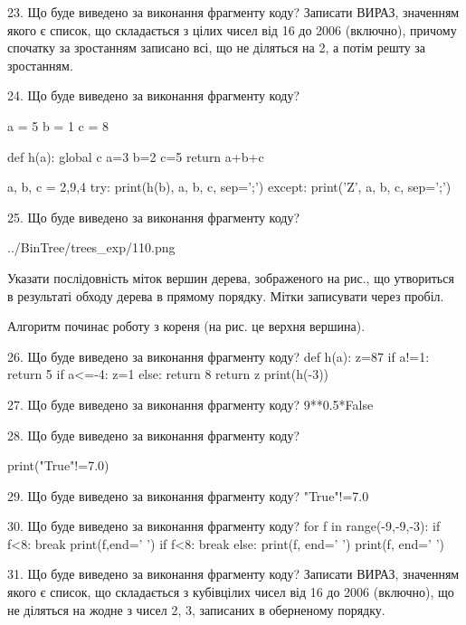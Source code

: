 \documentclass[11pt]{article}
\begin{document}

23. Що буде виведено за виконання фрагменту коду?
Записати ВИРАЗ, значенням якого є список, що складається з цілих чисел від 16 до 2006 (включно), причому спочатку за зростанням записано всі, що не діляться на 2, а потім решту за зростанням.


24. Що буде виведено за виконання фрагменту коду?

a = 5
b = 1
c = 8

def h(a):
global c    a=3
    b=2
    c=5
    return a+b+c

a, b, c = 2,9,4
try:
    print(h(b), a, b, c, sep=';')
except:
    print('Z', a, b, c, sep=';')


25. Що буде виведено за виконання фрагменту коду?

\begin{center}
	{../BinTree/trees_exp/110.png}
\end{center}
Указати послідовність міток вершин дерева, зображеного на рис., що утвориться в результаті обходу дерева в прямому порядку. Мітки записувати через пробіл.\par Алгоритм починає роботу з кореня (на рис. це верхня вершина).


26. Що буде виведено за виконання фрагменту коду?
def h(a):
      z=87
      if a!=1: return 5
      if a<=-4: z=1
      else: return 8
      return z
   print(h(-3))

27. Що буде виведено за виконання фрагменту коду?
9**0.5*False

28. Що буде виведено за виконання фрагменту коду?

print("True"!=7.0)


29. Що буде виведено за виконання фрагменту коду?
"True"!=7.0

30. Що буде виведено за виконання фрагменту коду?
for f in range(-9,-9,-3):
    if f<8:
        break
        print(f,end=' ')
    if f<8:
        break
else:
    print(f, end=' ')
print(f, end=' ')


31. Що буде виведено за виконання фрагменту коду?
Записати ВИРАЗ, значенням якого є список, що складається з кубівцілих чисел від 16 до 2006 (включно), що не діляться на жодне з чисел 2, 3, записаних в обернено\-му порядку.
\end{document}
